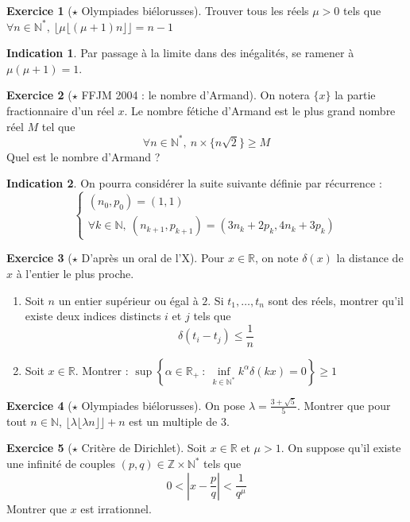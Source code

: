 \documentclass[french]{book}
\newcommand{\N}{\mathbb{N}}
\newcommand{\Z}{\mathbb{Z}}
\newcommand{\R}{\mathbb{R}}
\newcommand{\st}{^*}
\theoremstyle{definition}
\newtheorem{ex}{Exercice}[chapter]
\theoremstyle{theorem}
\newtheorem*{ind}{Indication}
\theoremstyle{remark}
\begin{document}
\begin{ex}[$\star$ Olympiades biélorusses]
	Trouver tous les réels $\mu>0$ tels que $\forall n\in\N\st,\ \lfloor\mu\lfloor(\mu+1)n\rfloor\rfloor=n-1$
\end{ex}

\begin{ind}
	Par passage à la limite dans des inégalités, se ramener à $\mu(\mu+1)=1$.
\end{ind}

\begin{ex}[$\star$ FFJM 2004 : le nombre d'Armand]
	On notera $\{x\}$ la partie fractionnaire d'un réel $x$. Le nombre fétiche d'Armand est le plus grand nombre réel $M$ tel que $$\forall n\in\N\st,\ n\times\{n\sqrt{2}\}\geqslant M$$
	Quel est le nombre d'Armand ?
\end{ex}

\begin{ind}
	On pourra considérer la suite suivante définie par récurrence : $$\begin{cases}
		(n_0,p_0)=(1,1)\\
		\forall k\in\N,\ (n_{k+1},p_{k+1})=(3n_k+2p_k,4n_k+3p_k)
	\end{cases}$$
\end{ind}

\begin{ex}[$\star$ D'après un oral de l'X]
	Pour $x\in\R$, on note $\delta(x)$ la distance de $x$ à l'entier le plus proche. 
	\begin{enumerate}
		\item Soit $n$ un entier supérieur ou égal à $2$. Si $t_1,\ldots,t_n$ sont des réels, montrer qu'il existe deux indices distincts $i$ et $j$ tels que $$\delta(t_i-t_j)\leqslant\frac{1}{n}$$
		\item Soit $x\in\R$. Montrer : $\sup\left\{\alpha\in\R_+\ : \ \underset{k\in\N\st}{\inf}k^\alpha\delta(kx)=0\right\}\geqslant 1$
	\end{enumerate}
\end{ex}

\begin{ex}[$\star$ Olympiades biélorusses]
	On pose $\lambda=\displaystyle\frac{3+\sqrt{5}}{5}$. Montrer que pour tout $n\in\N$, $\lfloor \lambda\lfloor\lambda n\rfloor\rfloor+n$ est un multiple de $3$.
\end{ex}

\begin{ex}[$\star$ Critère de Dirichlet]
	Soit $x\in\R$ et $\mu>1$. On suppose qu'il existe une infinité de couples $(p,q)\in\Z\times\N\st$ tels que $$0<\left\lvert x-\frac{p}{q}\right\rvert<\frac{1}{q^\mu}$$ Montrer que $x$ est irrationnel.
\end{ex}
\end{document}
